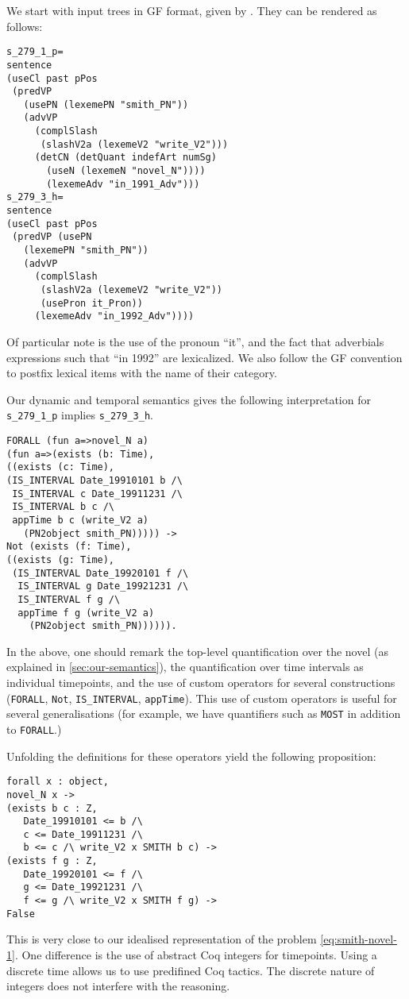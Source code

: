 \documentclass[a4paper,11pt]{article}
\begin{document}
We start with input trees in GF format, given by
\citet{Ljunglof:2012}. They can be rendered as follows:

{\small
\begin{verbatim}
s_279_1_p=
sentence 
(useCl past pPos
 (predVP
   (usePN (lexemePN "smith_PN"))
   (advVP
     (complSlash
      (slashV2a (lexemeV2 "write_V2")))
     (detCN (detQuant indefArt numSg)
       (useN (lexemeN "novel_N"))))
       (lexemeAdv "in_1991_Adv")))
s_279_3_h=
sentence
(useCl past pPos
 (predVP (usePN
   (lexemePN "smith_PN"))
   (advVP
     (complSlash
      (slashV2a (lexemeV2 "write_V2"))
      (usePron it_Pron))
     (lexemeAdv "in_1992_Adv"))))
\end{verbatim}

  Of particular note is the use of the pronoun ``it'', and the fact
  that adverbials expressions such that ``in 1992'' are lexicalized.
  We also follow the GF convention to postfix lexical items with the
  name of their category.

Our dynamic and temporal semantics gives the following interpretation
for \verb!s_279_1_p! implies \verb!s_279_3_h!.
\begin{verbatim}
FORALL (fun a=>novel_N a)
(fun a=>(exists (b: Time),
((exists (c: Time),
(IS_INTERVAL Date_19910101 b /\
 IS_INTERVAL c Date_19911231 /\
 IS_INTERVAL b c /\
 appTime b c (write_V2 a)
   (PN2object smith_PN))))) ->
Not (exists (f: Time),
((exists (g: Time),
 (IS_INTERVAL Date_19920101 f /\
  IS_INTERVAL g Date_19921231 /\
  IS_INTERVAL f g /\
  appTime f g (write_V2 a) 
    (PN2object smith_PN)))))).
\end{verbatim}
In the above, one should remark the top-level quantification over the
novel (as explained in \cref{sec:our-semantics}), the quantification
over time intervals as individual timepoints, and the use of custom
operators for several constructions (\verb!FORALL!, \verb!Not!, \verb!IS_INTERVAL!,
\verb!appTime!). This use of custom operators is useful for several
generalisations (for example, we have quantifiers such as \verb!MOST! in
addition to \verb!FORALL!.)

Unfolding the definitions for these operators yield the following
proposition:
\begin{verbatim}
forall x : object,
novel_N x ->
(exists b c : Z,
   Date_19910101 <= b /\
   c <= Date_19911231 /\
   b <= c /\ write_V2 x SMITH b c) ->
(exists f g : Z,
   Date_19920101 <= f /\
   g <= Date_19921231 /\
   f <= g /\ write_V2 x SMITH f g) ->
False
\end{verbatim}
This is very close to our idealised representation of the problem
\cref{eq:smith-novel-1}. One difference is the use of abstract Coq
integers for timepoints. Using a discrete time allows us to use
predifined Coq tactics. The discrete nature of integers does not
interfere with the reasoning.

}
\end{document}
